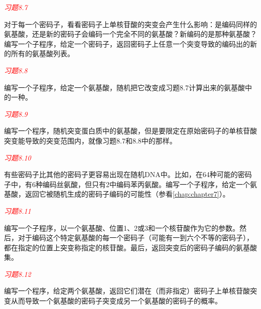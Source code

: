 \textcolor{red}{\textit{习题8.7}}
\begin{adjustwidth}{4em}{}
对于每一个密码子，看看密码子上单核苷酸的突变会产生什么影响：是编码同样的氨基酸，还是新的密码子会编码一个完全不同的氨基酸？新编码的是那种氨基酸？编写一个子程序，给定一个密码子，返回密码子上任意一个突变导致的编码出的新的所有的氨基酸列表。
\end{adjustwidth}

\textcolor{red}{\textit{习题8.8}}
\begin{adjustwidth}{4em}{}
编写一个子程序，给定一个氨基酸，随机把它改变成习题8.7计算出来的氨基酸中的一种。
\end{adjustwidth}

\textcolor{red}{\textit{习题8.9}}
\begin{adjustwidth}{4em}{}
编写一个程序，随机突变蛋白质中的氨基酸，但是要限定在原始密码子的单核苷酸突变能导致的突变范围内，就像习题8.7和8.8中的那样。
\end{adjustwidth}

\textcolor{red}{\textit{习题8.10}}
\begin{adjustwidth}{4em}{}
有些密码子比其他的密码子更容易出现在随机DNA中。比如，在64种可能的密码子中，有6种编码丝氨酸，但只有2中编码苯丙氨酸。编写一个子程序，给定一个氨基酸，返回它被随机生成的密码子编码的可能性（参看\autoref{chap:chapter7}）。
\end{adjustwidth}

\textcolor{red}{\textit{习题8.11}}
\begin{adjustwidth}{4em}{}
编写一个子程序，以一个氨基酸、位置1、2或3和一个核苷酸作为它的参数。然后，对于编码这个特定氨基酸的每一个密码子（可能有一到六个不等的密码子），都在指定的位置上突变称指定的核苷酸。最后，返回突变后的密码子编码的氨基酸集。
\end{adjustwidth}

\textcolor{red}{\textit{习题8.12}}
\begin{adjustwidth}{4em}{}
编写一个程序，给定两个氨基酸，返回它们潜在（而非指定）密码子上单核苷酸突变从而导致一个氨基酸的密码子突变成另一个氨基酸的密码子的概率。
\end{adjustwidth}

